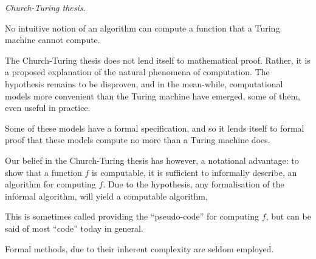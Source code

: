 \begin{hypothesis} \textit{Church-Turing thesis.}

No intuitive notion of an algorithm can compute a function that a Turing
machine cannot compute.

\end{hypothesis}

The Church-Turing thesis does not lend itself to mathematical proof. Rather, it
is a proposed explanation of the natural phenomena of computation. The
hypothesis remains to be disproven, and in the mean-while, computational models
more convenient than the Turing machine have emerged, some of them, even useful
in practice.

Some of these models have a formal specification, and so it lends itself to
formal proof that these models compute no more than a Turing machine does.

Our belief in the Church-Turing thesis has however, a notational advantage: to
show that a function $f$ is computable, it is sufficient to informally
describe, an algorithm for computing $f$. Due to the hypothesis, any
formalisation of the informal algorithm, will yield a computable algorithm,

This is sometimes called providing the ``pseudo-code'' for computing $f$, but can be said
of most ``code'' today in general.

Formal methods, due to their inherent complexity are seldom employed.








